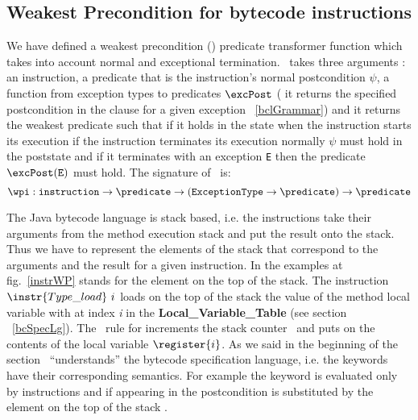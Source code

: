 \subsection{Weakest Precondition for bytecode instructions}\label{wpInstr}
We have defined a weakest precondition (\wpi) predicate transformer function which takes into account normal and exceptional termination. 
\wpi \ takes three arguments : an instruction, a predicate that is the instruction's normal postcondition $\psi$, a function
from exception types to predicates $\excPost$ ( it returns the specified postcondition in the  clause for a given exception ~\ref{bclGrammar})  and it returns the weakest predicate such that if it holds in the state when the instruction starts its execution if the instruction terminates its execution normally  $\psi$ must hold in the poststate and if it terminates with an exception \texttt{E} then the predicate $\excPost(\tt{E})$ must hold. The signature of \ \wpi is:
$$\wpi : \texttt{instruction} \rightarrow \predicate \rightarrow (\tt{ ExceptionType} \rightarrow  \predicate) \rightarrow \predicate   $$

 The Java bytecode language is stack based, i.e. the instructions take their arguments from the method execution stack and 
 put the result onto the stack. Thus we have to represent the elements of the stack that correspond to the arguments and the result for a given instruction. 
 In the examples at fig.~\ref{instrWP} \stack{\counter} stands for the element on the top of the stack. 
 The instruction $\instr{Type\_load} \ i$  loads on the top of the stack the value of the method local variable with at index \textit{i}
 in the \textbf{Local\_Variable\_Table} (see section ~\ref{bcSpecLg}). The \wpi \ rule for   increments the stack
counter \counter \ and puts on \stack{\counter} the contents of the local variable $\register{i}$.
As we said in the beginning of the section \wpi \ ``understands'' the bytecode specification language, i.e. the keywords have their 
corresponding semantics. For example the keyword  is evaluated only by  
instructions and if appearing in the postcondition   is substituted by the element on the top of 
the stack \stack{\counter}. 

